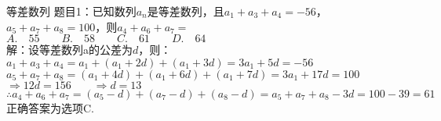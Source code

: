 \documentclass[aspectratio=169]{ctexbeamer} %
\date{\today}
\begin{document}
\begin{frame}[t]{等差数列}
题目1：已知数列${a_n}$是等差数列，且$a_1 + a_3 + a_4 = -56$，$a_5 + a_7 + a_8 = 100$，则$a_4 + a_6 + a_7 = $ \\
$A. \quad 55 \qquad B. \quad 58 \qquad C. \quad 61 \qquad D. \quad 64$ \\

\vspace{0.5cm}
\pause
解：设等差数列{a}的公差为$d$，则：\\
\pause
$a_1 + a_3 + a_4 = a_1 + (a_1 + 2d) + (a_1 + 3d) = 3a_1 + 5d = -56$ \\
$a_5 + a_7 + a_8 = (a_1 + 4d) + (a_1 + 6d) + (a_1 + 7d) = 3a_1 + 17d = 100$ \\
$\Rightarrow 12d = 156 \qquad \Rightarrow d = 13$ \\
$\therefore a_4 + a_6 + a_7 = (a_5 - d) + (a_7 - d) + (a_8 - d) = a_5 + a_7 + a_8 - 3d = 100 - 39 = 61$ \\
\pause
正确答案为选项C.
\end{frame}
\end{document}
